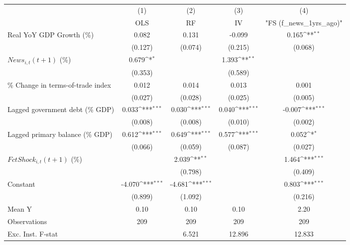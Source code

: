 {
\def\sym#1{\ifmmode^{#1}\else\(^{#1}\)\fi}
\begin{tabular}{l*{4}{c}}
\toprule
                    &\multicolumn{1}{c}{(1)}&\multicolumn{1}{c}{(2)}&\multicolumn{1}{c}{(3)}&\multicolumn{1}{c}{(4)}\\
                    &\multicolumn{1}{c}{OLS}&\multicolumn{1}{c}{RF}&\multicolumn{1}{c}{IV}&\multicolumn{1}{c}{ "FS (f_news_1yrs_ago)" }\\
\midrule
Real YoY GDP Growth (\%)&       0.082         &       0.131         &      -0.099         &       0.165\sym{**} \\
                    &     (0.127)         &     (0.074)         &     (0.215)         &     (0.068)         \\
\addlinespace
$ News_{i,t}(t+1)$ (\%)&       0.679\sym{*}  &                     &       1.393\sym{**} &                     \\
                    &     (0.353)         &                     &     (0.589)         &                     \\
\addlinespace
\% Change in terms-of-trade index&       0.012         &       0.014         &       0.013         &       0.001         \\
                    &     (0.027)         &     (0.028)         &     (0.025)         &     (0.005)         \\
\addlinespace
Lagged government debt (\% GDP)&       0.033\sym{***}&       0.030\sym{***}&       0.040\sym{***}&      -0.007\sym{***}\\
                    &     (0.008)         &     (0.008)         &     (0.010)         &     (0.002)         \\
\addlinespace
Lagged primary balance (\% GDP)&       0.612\sym{***}&       0.649\sym{***}&       0.577\sym{***}&       0.052\sym{*}  \\
                    &     (0.066)         &     (0.059)         &     (0.087)         &     (0.027)         \\
\addlinespace
$ FctShock_{i,t}(t+1)$ (\%)&                     &       2.039\sym{**} &                     &       1.464\sym{***}\\
                    &                     &     (0.798)         &                     &     (0.409)         \\
\addlinespace
Constant            &      -4.070\sym{***}&      -4.681\sym{***}&                     &       0.803\sym{***}\\
                    &     (0.899)         &     (1.092)         &                     &     (0.216)         \\
\midrule
Mean Y              &        0.10         &        0.10         &        0.10         &        2.20         \\
Observations        &         209         &         209         &         209         &         209         \\
Exc. Inst. F-stat   &                     &       6.521         &      12.896         &      12.833         \\
\bottomrule
\end{tabular}
}
